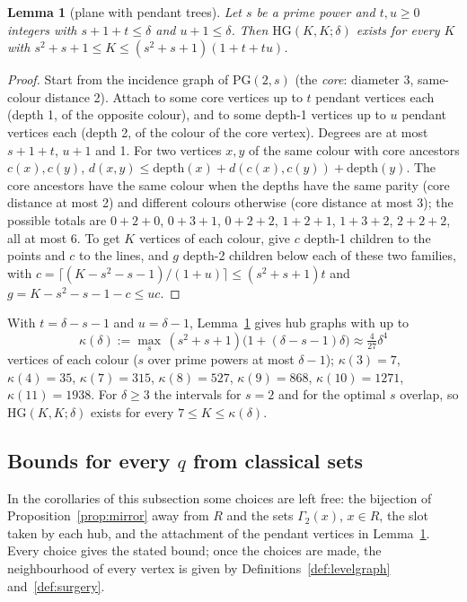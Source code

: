 \documentclass[11pt]{amsart}
\newtheorem{lemma}[theorem]{Lemma}
\theoremstyle{definition}
\theoremstyle{remark}
\numberwithin{equation}{section}
\newcommand{\PG}{\mathrm{PG}}
\begin{document}
\begin{lemma}[plane with pendant trees]\label{lem:pendant}
Let $s$ be a prime power and $t,u\ge0$ integers with $s+1+t\le\delta$ and $u+1\le\delta$. Then $\mathrm{HG}(K,K;\delta)$
exists for every $K$ with $s^2+s+1\le K\le(s^2+s+1)(1+t+tu)$.
\end{lemma}

\begin{proof}
Start from the incidence graph of $\PG(2,s)$ (the \emph{core}: diameter 3, same-colour distance 2). Attach to some core
vertices up to $t$ pendant vertices each (depth 1, of the opposite colour), and to some depth-1 vertices up to $u$ pendant
vertices each (depth 2, of the colour of the core vertex). Degrees are at most $s+1+t$, $u+1$ and 1. For two vertices $x,y$
of the same colour with core ancestors $c(x),c(y)$, $d(x,y)\le\mathrm{depth}(x)+d(c(x),c(y))+\mathrm{depth}(y)$. The core
ancestors have the same colour when the depths have the same parity (core distance at most 2) and different colours
otherwise (core distance at most 3); the possible totals are $0+2+0$, $0+3+1$, $0+2+2$, $1+2+1$, $1+3+2$, $2+2+2$, all at
most 6. To get $K$ vertices of each colour, give $c$ depth-1 children to the points and $c$ to the lines, and $g$ depth-2
children below each of these two families, with $c=\lceil(K-s^2-s-1)/(1+u)\rceil\le(s^2+s+1)t$ and $g=K-s^2-s-1-c\le uc$.
\end{proof}

With $t=\delta-s-1$ and $u=\delta-1$, Lemma~\ref{lem:pendant} gives hub graphs with up to
\[
\kappa(\delta):=\max_s\,(s^2+s+1)\bigl(1+(\delta-s-1)\delta\bigr)\approx\tfrac4{27}\delta^4
\]
vertices of each colour ($s$ over prime powers at most $\delta-1$); $\kappa(3)=7$, $\kappa(4)=35$, $\kappa(7)=315$,
$\kappa(8)=527$, $\kappa(9)=868$, $\kappa(10)=1271$, $\kappa(11)=1938$. For $\delta\ge3$ the intervals for $s=2$ and for the
optimal $s$ overlap, so $\mathrm{HG}(K,K;\delta)$ exists for every $7\le K\le\kappa(\delta)$.

\subsection{Bounds for every $q$ from classical sets}\label{ssec:d7general}
In the corollaries of this subsection some choices are left free: the bijection of Proposition~\ref{prop:mirror} away from
$R$ and the sets $\Gamma_2(x)$, $x\in R$, the slot taken by each hub, and the attachment of the pendant vertices in
Lemma~\ref{lem:pendant}. Every choice gives the stated bound; once the choices are made, the neighbourhood of every vertex is
given by Definitions~\ref{def:levelgraph} and~\ref{def:surgery}.
\end{document}
